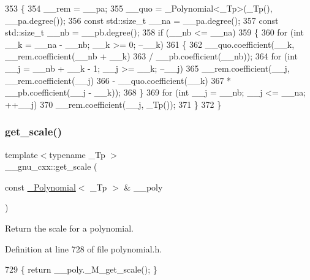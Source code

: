 \begin{DoxyCode}
353     \{
354       \_\_rem = \_\_pa;
355       \_\_quo = \_Polynomial<\_Tp>(\_Tp(), \_\_pa.degree());
356       \textcolor{keyword}{const} std::size\_t \_\_na = \_\_pa.degree();
357       \textcolor{keyword}{const} std::size\_t \_\_nb = \_\_pb.degree();
358       \textcolor{keywordflow}{if} (\_\_nb <= \_\_na)
359         \{
360           \textcolor{keywordflow}{for} (\textcolor{keywordtype}{int} \_\_k = \_\_na - \_\_nb; \_\_k >= 0; --\_\_k)
361             \{
362               \_\_quo.coefficient(\_\_k, \_\_rem.coefficient(\_\_nb + \_\_k)
363                                    / \_\_pb.coefficient(\_\_nb));
364               \textcolor{keywordflow}{for} (\textcolor{keywordtype}{int} \_\_j = \_\_nb + \_\_k - 1; \_\_j >= \_\_k; --\_\_j)
365                 \_\_rem.coefficient(\_\_j, \_\_rem.coefficient(\_\_j)
366                                      - \_\_quo.coefficient(\_\_k)
367                                      * \_\_pb.coefficient(\_\_j - \_\_k));
368             \}
369           \textcolor{keywordflow}{for} (\textcolor{keywordtype}{int} \_\_j = \_\_nb; \_\_j <= \_\_na; ++\_\_j)
370             \_\_rem.coefficient(\_\_j, \_Tp());
371         \}
372     \}
\end{DoxyCode}
\mbox{\label{namespace____gnu__cxx_a2af747c0e255f3fae4d9f118c2817e1a}} 
\subsubsection{\texorpdfstring{get\+\_\+scale()}{get\_scale()}\hspace{0.1cm}{\footnotesize\ttfamily [1/2]}}
{\footnotesize\ttfamily template$<$typename \+\_\+\+Tp $>$ \\
\+\_\+\+\_\+gnu\+\_\+cxx\+::get\+\_\+scale (\begin{DoxyParamCaption}\item[{const \hyperlink{class____gnu__cxx_1_1__Polynomial}{\+\_\+\+Polynomial}$<$ \+\_\+\+Tp $>$ \&}]{\+\_\+\+\_\+poly }\end{DoxyParamCaption})}

Return the scale for a polynomial. 

Definition at line 728 of file polynomial.\+h.


\begin{DoxyCode}
729     \{ \textcolor{keywordflow}{return} \_\_poly.\_M\_get\_scale(); \}
\end{DoxyCode}
\mbox{\label{namespace____gnu__cxx_a1a8bae104a6509f4e458d155acaf0476}} 
